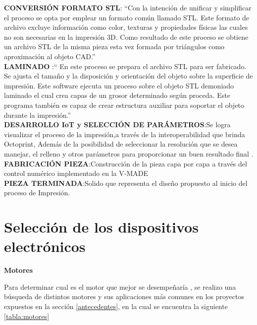 \textbf{CONVERSIÓN FORMATO STL}: “Con la intención de unificar y simplificar el proceso se opta por emplear un formato común llamado STL. Este formato de archivo excluye información como color, texturas y propiedades físicas las cuales no son necesarias en la impresión 3D. Como resultado de este proceso se obtiene un archivo STL de la misma pieza esta vez formada por triángulos como aproximación al objeto CAD.''\citep{sainz}\\

\textbf{LAMINADO }:“ En este proceso se prepara el archivo STL para ser fabricado. Se ajusta el tamaño y la disposición y orientación del objeto sobre la superficie de impresión. Este software ejecuta un proceso sobre el
objeto STL demoniado laminado el cual crea capas de un grosor determinado según proceda. Este programa también es capaz de crear estructura auxiliar para soportar el objeto durante la impresión.''\citep{sainz}\\

\textbf{DESARROLLO IoT y SELECCIÓN DE PARÁMETROS}:Se logra visualizar el proceso de la impresión,a través de la interoperabilidad que brinda Octoprint, Además de la posibilidad de seleccionar la resolución que se desea manejar, el relleno y otros parámetros para proporcionar un buen resultado final .\\

\textbf{FABRICACIÓN PIEZA}:Construcción de la pieza capa por capa a través del control numérico implementado en la V-MADE \\
\textbf{PIEZA TERMINADA}:Solido que representa el diseño propuesto al inicio del proceso de Impresión.\\

\section{Selección de los dispositivos electrónicos} \label{selector}

\textbf{Motores}

Para determinar cual es el motor que mejor se desempeñaría , se realizo una búsqueda de distintos motores y sus aplicaciones más comunes en los proyectos expuestos en la sección \ref{antecedentes}, en la cual se encuentra la siguiente \autoref{tabla:motores}



